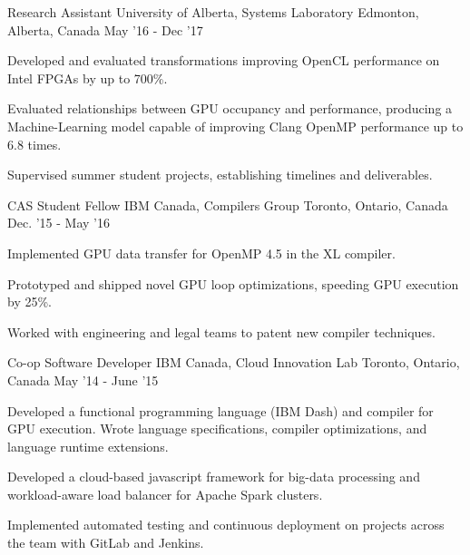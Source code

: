 \begin{cventries}
\cventry
    {Research Assistant} %
    {University of Alberta, Systems Laboratory} %
    {Edmonton, Alberta, Canada} %
    {May '16 - Dec '17} %
    {
        \begin{cvitems}
            \item Developed and evaluated transformations improving OpenCL performance on Intel FPGAs by up to 700\%.
            \item Evaluated relationships between GPU occupancy and performance, producing a Machine-Learning model capable of improving Clang OpenMP performance up to 6.8 times.
            \item Supervised summer student projects, establishing timelines and deliverables.
        \end{cvitems}
    }
\vspace{2mm}
\cventry
    {CAS Student Fellow} %
    {IBM Canada, Compilers Group} %
    {Toronto, Ontario, Canada} %
    {Dec. '15 - May '16} %
    {
        \begin{cvitems}
            \item Implemented GPU data transfer for OpenMP 4.5 in the XL compiler.
            \item Prototyped and shipped novel GPU loop optimizations, speeding GPU execution by 25\%.
            \item Worked with engineering and legal teams to patent new compiler techniques.
        \end{cvitems}
    }
\vspace{2mm}
\cventry
    {Co-op Software Developer} %
    {IBM Canada, Cloud Innovation Lab} %
    {Toronto, Ontario, Canada} %
    {May '14 - June '15} %
    {
        \begin{cvitems}
            \item Developed a functional programming language (IBM Dash) and compiler for GPU execution. Wrote language specifications, compiler optimizations, and language runtime extensions.
            \item Developed a cloud-based javascript framework for big-data processing and workload-aware load balancer for Apache Spark clusters.
            \item Implemented automated testing and continuous deployment on projects across the team with GitLab and Jenkins.
        \end{cvitems}
}
\end{cventries}
